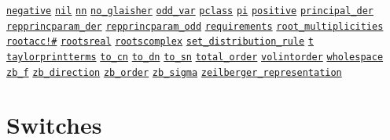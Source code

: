 \begin{list}{}
\hyperlink{reserved:NEGATIVE}{\texttt{negative}}
\hyperlink{reserved:NIL}{\texttt{nil}}
\hyperlink{reserved:NN}{\texttt{nn}}
\hyperlink{reserved:NO_GLAISHER}{\texttt{no\_glaisher}}
\hyperlink{variable:ODD_VAR}{\texttt{odd\_var}}
\hyperlink{reserved:PCLASS}{\texttt{pclass}}
\hyperlink{reserved:PI}{\texttt{pi}}
\hyperlink{reserved:POSITIVE}{\texttt{positive}}
\hyperlink{variable:PRINCIPAL_DER}{\texttt{principal\_der}}
\hyperlink{variable:RATES}{}
\hyperlink{variable:REPPRINCPARAM_DER}{\texttt{repprincparam\_der}}
\hyperlink{variable:REPPRINCPARAM_ODD}{\texttt{repprincparam\_odd}}
\hyperlink{reserved:requirements}{\texttt{requirements}}
\hyperlink{reserved:ROOT_MULTIPLICITIES}{\texttt{root\_multiplicities}}
\hyperlink{reserved:ROOTACC}{\texttt{rootacc!\#}}
\hyperlink{reserved:ROOTSREAL}{\texttt{rootsreal}}
\hyperlink{reserved:ROOTSCOMPLEX}{\texttt{rootscomplex}}
\hyperlink{reserved:SET_DISTRIBUTION_RULE}{\texttt{set\_distribution\_rule}}
\hyperlink{variable:SPECIES}{}
\hyperlink{reserved:T}{\texttt{t}}
\hyperlink{reserved:TAYLORPRINTTERMS}{\texttt{taylorprintterms}}
\hyperlink{reserved:TO_CN}{\texttt{to\_cn}}
\hyperlink{reserved:TO_DN}{\texttt{to\_dn}}
\hyperlink{reserved:TO_SN}{\texttt{to\_sn}}
\hyperlink{variable:TOTAL_ORDER}{\texttt{total\_order}}
\hyperlink{reserved:VOLINTORDER}{\texttt{volintorder}}
\hyperlink{reserved:WHOLESPACE}{\texttt{wholespace}}
\hyperlink{reserved:ZB_F}{\texttt{zb\_f}}
\hyperlink{reserved:ZB_DIRECTION}{\texttt{zb\_direction}}
\hyperlink{reserved:ZB_ORDER}{\texttt{zb\_order}}
\hyperlink{reserved:ZB_SIGMA}{\texttt{zb\_sigma}}
\hyperlink{reserved:ZEILBERGER_REPRESENTATION}{\texttt{zeilberger\_representation}}
\halfinterwordspace

\section{Switches}


\end{list}
